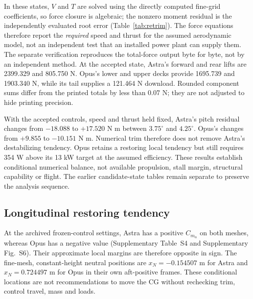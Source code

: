 \documentclass[11pt,a4paper]{article}
\begin{document}
In these states, $V$ and $T$ are solved using the directly computed fine-grid coefficients, so force closure is algebraic; the nonzero moment residual is the independently evaluated root error (Table~\ref{tab:retrim}). The force equations therefore report the \emph{required} speed and thrust for the assumed aerodynamic model, not an independent test that an installed power plant can supply them. The separate verification reproduces the total-force output byte for byte, not by an independent method. At the accepted state, Astra's forward and rear lifts are 2399.329 and 805.750 N. Opus's lower and upper decks provide 1695.739 and 1903.340 N, while its tail supplies a 121.464 N download. Rounded component sums differ from the printed totals by less than 0.07 N; they are not adjusted to hide printing precision.

With the accepted controls, speed and thrust held fixed, Astra's pitch residual changes from $-18.088$ to $+17.520$ N m between $3.75^\circ$ and $4.25^\circ$. Opus's changes from $+9.855$ to $-10.151$ N m. Numerical trim therefore does not remove Astra's destabilizing tendency. Opus retains a restoring local tendency but still requires 354 W above its 13 kW target at the assumed efficiency. These results establish conditional numerical balance, not available propulsion, stall margin, structural capability or flight. The earlier candidate-state tables remain separate to preserve the analysis sequence.

\subsection{Longitudinal restoring tendency}
At the archived frozen-control settings, Astra has a positive $C_{m_\alpha}$ on both meshes, whereas Opus has a negative value (Supplementary Table~S4 and Supplementary Fig.~S6). Their approximate local margins are therefore opposite in sign. The fine-mesh, constant-height neutral positions are $x_N=-0.154507$ m for Astra and $x_N=0.724497$ m for Opus in their own aft-positive frames. These conditional locations are not recommendations to move the CG without rechecking trim, control travel, mass and loads.
\end{document}
